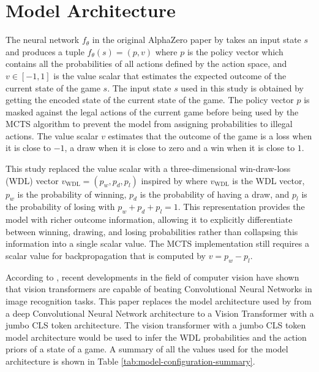 \section{Model Architecture}

The neural network $f_{\theta}$ in the original AlphaZero paper by \cite{silver2017masteringchessshogiselfplay} takes an input state $s$ and produces a tuple $f_{\theta}(s) = (p, v)$ where $p$ is the policy vector which contains all the probabilities of all actions defined by the action space, and $v \in [-1, 1]$ is the value scalar that estimates the expected outcome of the current state of the game $s$. The input state $s$ used in this study is obtained by getting the encoded state of the current state of the game. The policy vector $p$ is masked against the legal actions of the current game before being used by the MCTS algorithm to prevent the model from assigning probabilities to illegal actions. The value scalar $v$ estimates that the outcome of the game is a loss when it is close to $-1$, a draw when it is close to zero and a win when it is close to $1$.

This study replaced the value scalar with a three-dimensional win-draw-loss (WDL) vector $v_{\text{WDL}} = (p_w, p_d, p_l)$ inspired by \cite{czech2024representationmattersmasteringchess} where $v_{\text{WDL}}$ is the WDL vector, $p_w$ is the probability of winning, $p_d$ is the probability of having a draw, and $p_l$ is the probability of losing with $p_w + p_d + p_l = 1$. This representation provides the model with richer outcome information, allowing it to explicitly differentiate between winning, drawing, and losing probabilities rather than collapsing this information into a single scalar value. The MCTS implementation still requires a scalar value for backpropagation that is computed by $v = p_w - p_l$.

According to \cite{dosovitskiy2021imageworth16x16words}, recent developments in the field of computer vision have shown that vision transformers are capable of beating Convolutional Neural Networks in image recognition tasks. This paper replaces the model architecture used by \cite{Popic_Boskovic_Brest_2021} from a deep Convolutional Neural Network architecture to a Vision Transformer with a jumbo CLS token architecture. The vision transformer with a jumbo CLS token model architecture would be used to infer the WDL probabilities and the action priors of a state of a game. A summary of all the values used for the model architecture is shown in Table \ref{tab:model-configuration-summary}.

